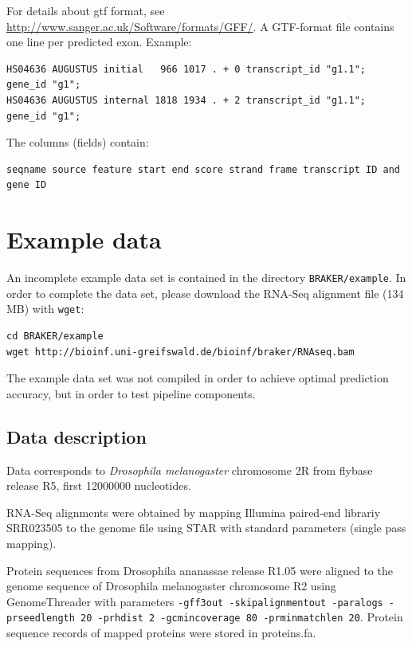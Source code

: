 \documentclass[]{article}
\begin{document}
For details about gtf format, see
\url{http://www.sanger.ac.uk/Software/formats/GFF/}. A GTF-format file
contains one line per predicted exon. Example:

\begin{verbatim}
HS04636 AUGUSTUS initial   966 1017 . + 0 transcript_id "g1.1"; gene_id "g1";
HS04636 AUGUSTUS internal 1818 1934 . + 2 transcript_id "g1.1"; gene_id "g1";
\end{verbatim}

The columns (fields) contain:

\begin{verbatim}
seqname source feature start end score strand frame transcript ID and gene ID
\end{verbatim}

\section{Example data}\label{example-data}

An incomplete example data set is contained in the directory
\texttt{BRAKER/example}. In order to complete the data set, please
download the RNA-Seq alignment file (134 MB) with \texttt{wget}:

\begin{verbatim}
cd BRAKER/example
wget http://bioinf.uni-greifswald.de/bioinf/braker/RNAseq.bam
\end{verbatim}

The example data set was not compiled in order to achieve optimal
prediction accuracy, but in order to test pipeline components.

\subsection{Data description}\label{data-description}

Data corresponds to \emph{Drosophila melanogaster} chromosome 2R from
flybase release R5, first 12000000 nucleotides.

RNA-Seq alignments were obtained by mapping Illumina paired-end librariy
SRR023505 to the genome file using STAR with standard parameters (single
pass mapping).

Protein sequences from Drosophila ananassae release R1.05 were aligned
to the genome sequence of Drosophila melanogaster chromosome R2 using
GenomeThreader with parameters
\texttt{-gff3out\ -skipalignmentout\ -paralogs\ -prseedlength\ 20\ -prhdist\ 2\ -gcmincoverage\ 80\ -prminmatchlen\ 20}.
Protein sequence records of mapped proteins were stored in proteins.fa.
\end{document}
